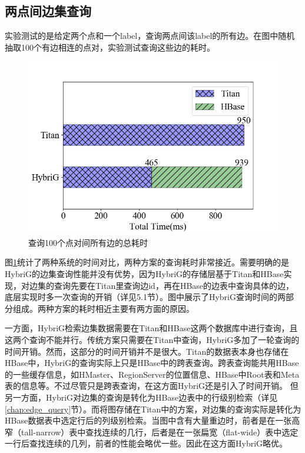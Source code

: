 \subsection{两点间边集查询}
实验测试的是给定两个点和一个label，查询两点间该label的所有边。在图中随机抽取100个有边相连的点对，实验测试查询这些边的耗时。

\begin{figure}[htbp]
\centering
\includegraphics[width=120mm]{fig/edge_query_perf.png}
\caption{查询100个点对间所有边的总耗时}
\label{fig:edge_query_perf}
\end{figure}

图\ref{fig:edge_query_perf}统计了两种系统的时间对比，两种方案的查询耗时非常接近。需要明确的是HybriG的边集查询性能并没有优势，因为HybriG的存储层基于Titan和HBase实现，对边集的查询先要在Titan里查询边id，再在HBase的边表中查询具体的边，底层实现时多一次查询的开销（详见5.1节）。图中展示了HybriG查询时间的两部分组成。两种方案的耗时相近主要有两方面的原因。

一方面，HybriG检索边集数据需要在Titan和HBase这两个数据库中进行查询，且这两个查询不能并行。传统方案只需要在Titan中查询，HybriG多加了一轮查询的时间开销。然而，这部分的时间开销并不是很大。Titan的数据表本身也存储在HBase中，HybriG的查询实际上只是HBase中的跨表查询。跨表查询能共用HBase的一些缓存信息，如HMaster、RegionServer的位置信息、HBase中Root表和Meta表的信息等。不过尽管只是跨表查询，在这方面HybriG还是引入了时间开销。
但另一方面，HybriG对边集的查询是转化为HBase边表中的行级别检索（详见\ref{chap:edge_query}节）。而将图存储在Titan中的方案，对边集的查询实际是转化为HBase数据表中选定行后的列级别检索。当图中含有大量重边时，前者是在一张高窄（tall-narrow）表中查找连续的几行，后者是在一张扁宽（flat-wide）表中选定一行后查找连续的几列，前者的性能会略优一些。因此在这方面HybriG略优。


